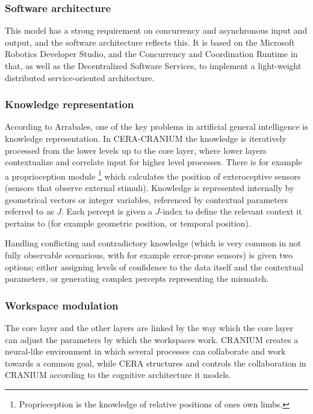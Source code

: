 \subsubsection{Software architecture}
This model has a strong requirement on concurrency and asynchronous input and
output, and the software architecture reflects this. It is based on the
Microsoft Robotics Developer Studio, and the Concurrency and Coordination
Runtime in that, as well as the Decentralized Software Services, to implement a
light-weight distributed service-oriented architecture.

\subsubsection{Knowledge representation}
According to Arrabales\cite{arrabales2009ceracranium}, one of the key problems
in artificial general intelligence is knowledge representation. In CERA-CRANIUM
the knowledge is iteratively processed from the lower levels up to the core
layer, where lower layers contextualize and correlate input for higher level
processes. There is for example a proprioception module \footnote{Proprieception
is the knowledge of relative positions of ones own limbs.} which calculates the
position of exteroceptive sensors (sensors that observe external stimuli).
Knowledge is represented internally by geometrical vectors or integer variables,
referenced by contextual parameters referred to as $J$. Each percept is given a
$J$-index to define the relevant context it pertains to (for example geometric
position, or temporal position).

Handling conflicting and contradictory knowledge (which is very common in not
fully observable scenarious, with for example error-prone sensors) is given two
options; either assigning levels of confidence to the data itself and the
contextual parameters, or generating complex percepts representing the mismatch.

\subsubsection{Workspace modulation}
The core layer and the other layers are linked by the way which the
core layer can adjust the parameters by which the workspaces work. CRANIUM
creates a neural-like environment in which several processes can collaborate
and work towards a common goal, while CERA structures and controls the
collaboration in CRANIUM according to the cognitive architecture it models.

